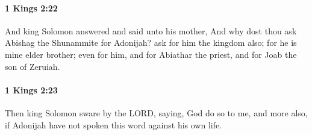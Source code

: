 		\paragraph{1 Kings 2:22} %
			\label{1KINGS-2-22}

			And king Solomon answered and said unto his mother, And why dost thou ask Abishag the Shunammite for Adonijah? ask for him the kingdom also; for he is mine elder brother; even for him, and for Abiathar the priest, and for Joab the son of Zeruiah.


		\paragraph{1 Kings 2:23} %
			\label{1KINGS-2-23}

			Then king Solomon sware by the LORD, saying, God do so to me, and more also, if Adonijah have not spoken this word against his own life.

